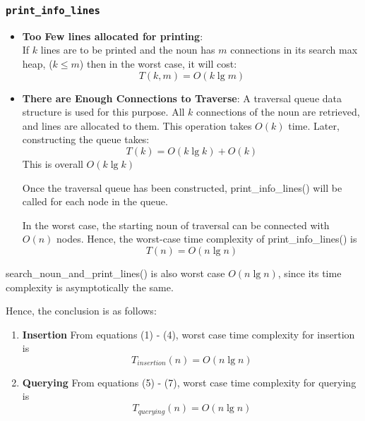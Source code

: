 \documentclass[conference]{IEEEtran}
\begin{document}
\subsubsection{\textbf{\texttt{print\_info\_lines}}}
    \begin{itemize}
        \item \textbf{Too Few lines allocated for printing}: 
\\If $k$ lines are to be printed
and the noun has $m$ connections in its search max heap, ($k \leq m$)
then in the worst case, it will cost:
\begin{equation}
	T(k, m) = O(k\lg m)
\end{equation}

\item \textbf{There are Enough Connections to Traverse}: 
A traversal queue data structure is used for this purpose.
All $k$ connections of the noun are retrieved, and lines are
allocated to them. This operation takes $O(k)$ time. Later,
constructing the queue takes:
\begin{equation}
    T(k) = O(k\lg k) + O(k)
\end{equation}
This is overall $O(k\lg k)$

Once the traversal queue has been constructed, print\_info\_lines() will be called for each node
in the queue.

In the worst case, the starting noun of traversal can be connected with $O(n)$ nodes. Hence, the worst-case time complexity of print\_info\_lines() is
\begin{equation}
    T(n) = O(n\lg n)
\end{equation}
\end{itemize}

search\_noun\_and\_print\_lines() is also worst case $O(n \lg n)$, since its time complexity is asymptotically the same.

Hence, the conclusion is as follows:
\begin{enumerate}
    \item \textbf{Insertion} From equations (1) - (4), worst case time complexity for insertion is 
    \begin{equation*}
        T_{insertion}(n) = O(n\lg n) 
    \end{equation*}

    \item \textbf{Querying} From equations (5) - (7), worst case time complexity for querying is 
    \begin{equation*}
        T_{querying}(n) = O(n\lg n) 
    \end{equation*}
\end{enumerate}
\end{document}
